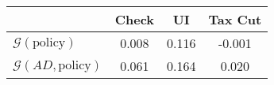 \begin{tabular}{@{}lccc@{}} 
\toprule 
                          & Check      & UI    & Tax Cut    \\  \midrule 
$\mathcal{G}(\text{policy})$ & 0.008  & 0.116  & -0.001     \\ 
$\mathcal{G}(AD,\text{policy})$ & 0.061  & 0.164  & 0.020     \\ 
\end{tabular}  
